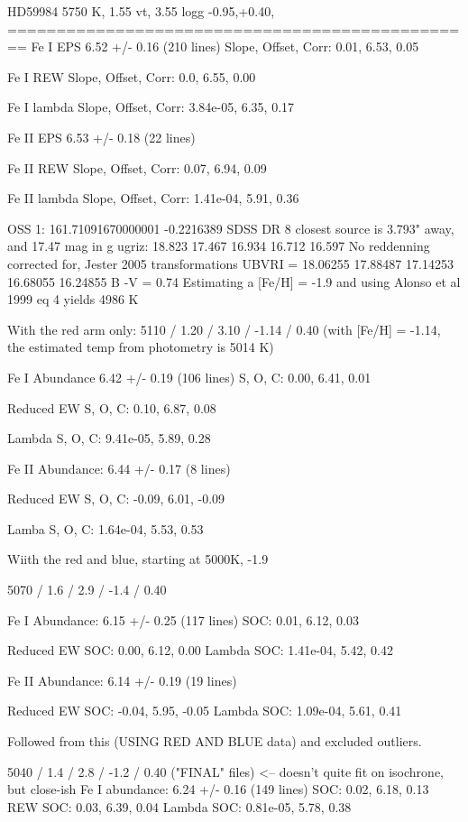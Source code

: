 \documentclass{emulateapj}
\begin{document}
HD59984 5750 K, 1.55 vt, 3.55 logg -0.95,+0.40,
================================================
Fe I EPS 6.52 +/- 0.16 (210 lines)
Slope, Offset, Corr: 0.01, 6.53, 0.05

Fe I REW
Slope, Offset, Corr: 0.0, 6.55, 0.00

Fe I lambda
Slope, Offset, Corr: 3.84e-05, 6.35, 0.17

Fe II EPS 6.53 +/- 0.18 (22 lines)

Fe II REW
Slope, Offset, Corr: 0.07, 6.94, 0.09

Fe II lambda
Slope, Offset, Corr: 1.41e-04, 5.91, 0.36


OSS 1:
161.71091670000001 -0.2216389
SDSS DR 8 closest source is 3.793" away, and 17.47 mag in g
ugriz: 18.823 17.467 16.934 16.712 16.597
No reddenning corrected for, Jester 2005 transformations
UBVRI = 18.06255 17.88487 17.14253 16.68055 16.24855
B -V = 0.74
Estimating a [Fe/H] = -1.9 and using Alonso et al 1999 eq 4 yields 4986 K

With the red arm only:
5110 / 1.20 / 3.10 / -1.14 / 0.40
(with [Fe/H] = -1.14, the estimated temp from photometry is 5014 K)

Fe I Abundance 6.42 +/- 0.19 (106 lines)
S, O, C: 0.00, 6.41, 0.01

Reduced EW S, O, C: 0.10, 6.87, 0.08

Lambda S, O, C: 9.41e-05, 5.89, 0.28

Fe II Abundance: 6.44 +/- 0.17 (8 lines)

Reduced EW S, O, C: -0.09, 6.01, -0.09

Lamba S, O, C: 1.64e-04, 5.53, 0.53

Wiith the red and blue, starting at 5000K, -1.9

5070 / 1.6 / 2.9 / -1.4 / 0.40

Fe I Abundance: 6.15 +/- 0.25 (117 lines)
SOC: 0.01, 6.12, 0.03

Reduced EW SOC: 0.00, 6.12, 0.00
Lambda SOC: 1.41e-04, 5.42, 0.42

Fe II Abundance: 6.14 +/- 0.19 (19 lines)

Reduced EW SOC: -0.04, 5.95, -0.05
Lambda SOC: 1.09e-04, 5.61, 0.41

Followed from this (USING RED AND BLUE data) and excluded outliers.

5040 / 1.4 / 2.8 / -1.2 / 0.40 ("FINAL" files) <-- doesn't quite fit on isochrone, but close-ish
Fe I abundance: 6.24 +/- 0.16 (149 lines)
SOC: 0.02, 6.18, 0.13
REW SOC: 0.03, 6.39, 0.04
Lambda SOC: 0.81e-05, 5.78, 0.38
\end{document}
